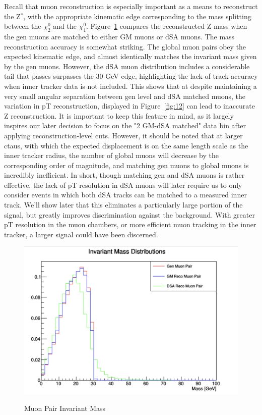 \documentclass{article}
\begin{document}
Recall that muon reconstruction is especially important as a means to reconstruct the Z$^{*}$, with the appropriate kinematic edge corresponding to the mass splitting between the $\chi_{2}^{0}$ and the $\chi_{1}^{0}$. Figure~\ref{fig:14} compares the reconstructed Z-mass when the gen muons are matched to either GM muons or dSA muons. The mass reconstruction accuracy is somewhat striking. The global muon pairs obey the expected kinematic edge, and almost identically matches the invariant mass given by the gen muons. However, the dSA muon distribution includes a considerable tail that passes surpasses the 30 GeV edge, highlighting the lack of track accuracy when inner tracker data is not included. This shows that at despite maintaining a very small angular separation between gen level and dSA matched muons, the variation in pT reconstruction, displayed in Figure~\ref{fig:12} can lead to inaccurate Z reconstruction. It is important to keep this feature in mind, as it largely inspires our later decision to focus on the "2 GM-dSA matched" data bin after applying reconstruction-level cuts. However, it should be noted that at larger ctaus, with which the expected displacement is on the same length scale as the inner tracker radius, the number of global muons will decrease by the corresponding order of magnitude, and matching gen muons to global muons is incredibly inefficient. In short, though matching gen and dSA muons is rather effective, the lack of pT resolution in dSA muons will later require us to only consider events in which both dSA tracks can be matched to a measured inner track. We'll show later that this eliminates a particularly large portion of the signal, but greatly improves discrimination against the background. With greater pT resolution in the muon chambers, or more efficient muon tracking in the inner tracker, a larger signal could have been discerned.
\begin{figure}[H]
    \centering
    \caption{Muon Pair Invariant Mass} 
    \includegraphics[width=12cm]{InvariantMassReco.png}
    \label{fig:14}
\end{figure}
\end{document}
